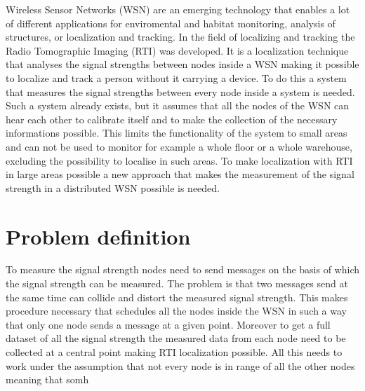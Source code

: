 

Wireless Sensor Networks (WSN) are an emerging technology that enables a lot of different applications for enviromental and habitat monitoring, analysis of structures, or localization and tracking. In the field of localizing and tracking the Radio Tomographic Imaging (RTI) was developed. It is a localization technique that analyses the signal strengths between nodes inside a WSN making it possible to localize and track a person without it carrying a device. To do this a system that measures the signal strengths between every node inside a system is needed. Such a system already exists, but it assumes that all the nodes of the WSN can hear each other to calibrate itself and to make the collection of the necessary informations possible. This limits the functionality of the system to small areas and can not be used to monitor for example a whole floor or a whole warehouse, excluding the possibility to localise in such areas. To make localization with RTI in large areas possible a new approach that makes the measurement of the signal strength in a distributed WSN possible is needed. 

\section{Problem definition}
To measure the signal strength nodes need to send messages on the basis of which the signal strength can be measured. The problem is that two messages send at the same time can collide and distort the measured signal strength. This makes procedure necessary that schedules all the nodes inside the WSN in such a way that only one node sends a message at a given point. Moreover to get a full dataset of all the signal strength the measured data from each node need to be collected at a central point making RTI localization possible. All this needs to work under the assumption that not every node is in range of all the other nodes meaning that somh

